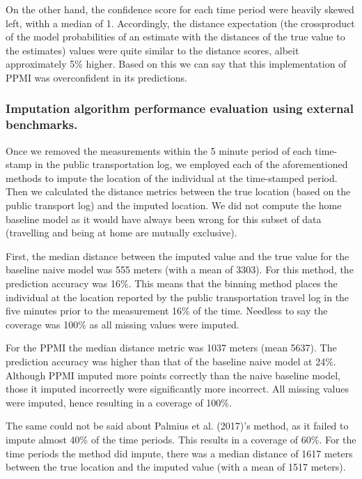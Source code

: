 \documentclass[man]{apa6}
\theoremstyle{definition}
\theoremstyle{definition}
\theoremstyle{definition}
\theoremstyle{remark}
\begin{document}
On the other hand, the confidence score for each time period were
heavily skewed left, withh a median of 1. Accordingly, the distance
expectation (the crossproduct of the model probabilities of an estimate
with the distances of the true value to the estimates) values were quite
similar to the distance scores, albeit approximately 5\% higher. Based
on this we can say that this implementation of PPMI was overconfident in
its predictions.

\subsubsection{Imputation algorithm performance evaluation using
external
benchmarks.}\label{imputation-algorithm-performance-evaluation-using-external-benchmarks.}

Once we removed the measurements within the 5 minute period of each
time-stamp in the public transportation log, we employed each of the
aforementioned methods to impute the location of the individual at the
time-stamped period. Then we calculated the distance metrics between the
true location (based on the public transport log) and the imputed
location. We did not compute the home baseline model as it would have
always been wrong for this subset of data (travelling and being at home
are mutually exclusive).

First, the median distance between the imputed value and the true value
for the baseline naive model was 555 meters (with a mean of 3303). For
this method, the prediction accuracy was 16\%. This means that the
binning method places the individual at the location reported by the
public transportation travel log in the five minutes prior to the
measurement 16\% of the time. Needless to say the coverage was 100\% as
all missing values were imputed.

For the PPMI the median distance metric was 1037 meters (mean 5637). The
prediction accuracy was higher than that of the baseline naive model at
24\%. Although PPMI imputed more points correctly than the naive
baseline model, those it imputed incorrectly were significantly more
incorrect. All missing values were imputed, hence resulting in a
coverage of 100\%.

The same could not be said about Palmius et al. (2017)'s method, as it
failed to impute almost 40\% of the time periods. This results in a
coverage of 60\%. For the time periods the method did impute, there was
a median distance of 1617 meters between the true location and the
imputed value (with a mean of 1517 meters).
\end{document}
